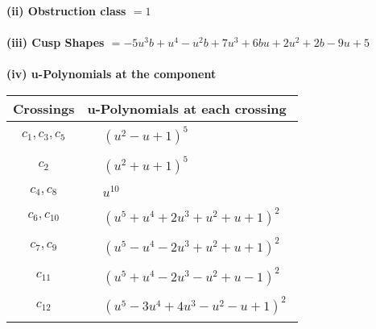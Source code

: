 \documentclass[1p]{elsarticle_modified}
\theoremstyle{definition}
\begin{document}
\flushleft \textbf{(ii) Obstruction class $= 1$}\\~\\
\flushleft \textbf{(iii) Cusp Shapes $= -5 u^3 b+u^4- u^2 b+7 u^3+6 b u+2 u^2+2 b-9 u+5$}\\~\\
\newpage\renewcommand{\arraystretch}{1}
\flushleft \textbf{(iv) u-Polynomials at the component}\newline \\
\begin{tabular}{m{50pt}|m{274pt}}
Crossings & \hspace{64pt}u-Polynomials at each crossing \\
\hline $$\begin{aligned}c_{1},c_{3},c_{5}\end{aligned}$$&$\begin{aligned}
&(u^2- u+1)^5
\end{aligned}$\\
\hline $$\begin{aligned}c_{2}\end{aligned}$$&$\begin{aligned}
&(u^2+u+1)^5
\end{aligned}$\\
\hline $$\begin{aligned}c_{4},c_{8}\end{aligned}$$&$\begin{aligned}
&u^{10}
\end{aligned}$\\
\hline $$\begin{aligned}c_{6},c_{10}\end{aligned}$$&$\begin{aligned}
&(u^5+u^4+2 u^3+u^2+u+1)^2
\end{aligned}$\\
\hline $$\begin{aligned}c_{7},c_{9}\end{aligned}$$&$\begin{aligned}
&(u^5- u^4-2 u^3+u^2+u+1)^2
\end{aligned}$\\
\hline $$\begin{aligned}c_{11}\end{aligned}$$&$\begin{aligned}
&(u^5+u^4-2 u^3- u^2+u-1)^2
\end{aligned}$\\
\hline $$\begin{aligned}c_{12}\end{aligned}$$&$\begin{aligned}
&(u^5-3 u^4+4 u^3- u^2- u+1)^2
\end{aligned}$\\
\hline
\end{tabular}\\~\\
\end{document}
